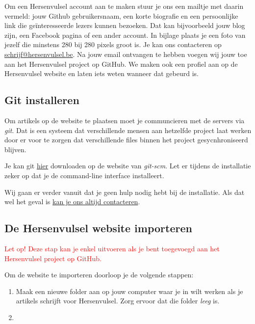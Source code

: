 \documentclass[12pt]{article}
\begin{document}
Om een Hersenvulsel account aan te maken stuur je ons een mailtje met daarin vermeld: jouw Github gebruikersnaam, een korte biografie en een persoonlijke link die geïnteresseerde lezers kunnen bezoeken. Dat kan bijvoorbeeld jouw blog zijn, een Facebook pagina of een ander account. In bijlage plaats je een foto van jezelf die minstens 280 bij 280 pixels groot is. Je kan ons contacteren op \href{mailto:schrijf@hersenvulsel.be}{schrijf@hersenvulsel.be}. Na jouw email ontvangen te hebben voegen wij jouw toe aan het Hersenvulsel project op GitHub. We maken ook een profiel aan op de Hersenvulsel website en laten iets weten wanneer dat gebeurd is.


\subsection{Git installeren}
Om artikels op de website te plaatsen moet je communcieren met de servers via \emph{git}. Dat is een systeem dat verschillende mensen aan hetzelfde project laat werken door er voor te zorgen dat verschillende files binnen het project gesycnhroniseerd blijven. 

Je kan git \href{https://git-scm.com/downloads}{hier} downloaden op de website van \emph{git-scm}. Let er tijdens de installatie zeker op dat je de command-line interface installeert. 

Wij gaan er verder vanuit dat je geen hulp nodig hebt bij de installatie. Als dat wel het geval is \href{http://hersenvulsel.be/contact/}{kan je ons altijd contacteren}.


\subsection{De Hersenvulsel website importeren}
\textcolor{red}{Let op! Deze stap kan je enkel uitvoeren als je bent toegevoegd aan het Hersenvulsel project op GitHub.}
\vspace{7 mm}

Om de website te importeren doorloop je de volgende stappen:

\begin{enumerate}
 \item{Maak een nieuwe folder aan op jouw computer waar je in wilt werken als je artikels schrijft voor Hersenvulsel. Zorg ervoor dat die folder \emph{leeg} is.}
 \item{}
\end{enumerate}
\end{document}
